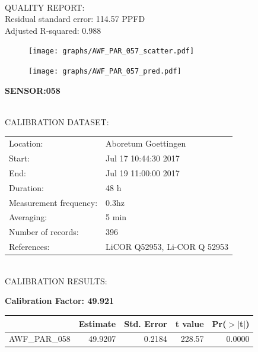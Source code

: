 \documentclass[oneside]{report}
\begin{document}
\hrulefill\\
QUALITY REPORT:\\
Residual standard error: 114.57 PPFD\\
Adjusted R-squared: 0.988



\begin{figure}[H]
  \centering
  \texttt{[image: graphs/AWF\_PAR\_057\_scatter.pdf]}
\end{figure}




\begin{figure}[H]
  \centering
  \texttt{[image: graphs/AWF\_PAR\_057\_pred.pdf]}
\end{figure}

\pagebreak


\begin{center}
\large{\textbf{SENSOR:058}}\\
\end{center}

\hrulefill\\
CALIBRATION DATASET:\\
\begin{table}[h!]
  \centering
  \label{tab:table1}
  \begin{tabular}{ll}
    Location: & Aboretum Goettingen\\ 
    
    
    Start:  & Jul 17 10:44:30 2017 \\
    End:   & Jul 19 11:00:00 2017\\ 
    Duration: & 48 h\\
    Measurement frequency: & 0.3hz\\
    Averaging:  &5 min\\
    Number of records: & 396 \\
    References: & LiCOR Q52953, Li-COR Q 52953 \\
  \end{tabular}
\end{table}

\hrulefill\\
CALIBRATION RESULTS:\\


\begin{center}
\textbf{\large{Calibration Factor: 49.921}}\\
\end{center}
\begin{table}[ht]
\centering
\begin{tabular}{rrrrr}
  \hline
 & Estimate & Std. Error & t value & Pr($>$$|$t$|$) \\ 
  \hline
AWF\_PAR\_058 & 49.9207 & 0.2184 & 228.57 & 0.0000 \\ 
   \hline
\end{tabular}
\end{table}
\end{document}
